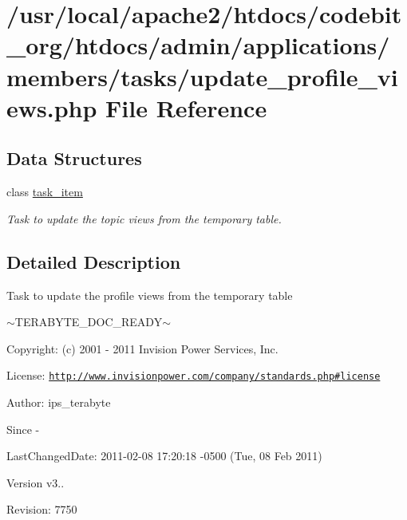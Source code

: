 \hypertarget{update__profile__views_8php}{\section{/usr/local/apache2/htdocs/codebit\-\_\-org/htdocs/admin/applications/members/tasks/update\-\_\-profile\-\_\-views.php File Reference}
\label{update__profile__views_8php}
}
\subsection*{Data Structures}
\begin{DoxyCompactItemize}
\item 
class \hyperlink{classtask__item}{task\-\_\-item}
\begin{DoxyCompactList}\small\item\em Task to update the topic views from the temporary table. \end{DoxyCompactList}\end{DoxyCompactItemize}


\subsection{Detailed Description}
\begin{DoxyVerb}  Task to update the profile views from the temporary table
\end{DoxyVerb}
 $\sim$\-T\-E\-R\-A\-B\-Y\-T\-E\-\_\-\-D\-O\-C\-\_\-\-R\-E\-A\-D\-Y$\sim$ \begin{DoxyParagraph}{Copyright\-:}
(c) 2001 -\/ 2011 Invision Power Services, Inc.
\end{DoxyParagraph}
\begin{DoxyParagraph}{License\-:}
\href{http://www.invisionpower.com/company/standards.php#license}{\tt http\-://www.\-invisionpower.\-com/company/standards.\-php\#license}
\end{DoxyParagraph}
\begin{DoxyParagraph}{Author\-:}
ips\-\_\-terabyte 
\end{DoxyParagraph}
\begin{DoxySince}{Since}
-\/ 
\end{DoxySince}
\begin{DoxyParagraph}{Last\-Changed\-Date\-:}
2011-\/02-\/08 17\-:20\-:18 -\/0500 (Tue, 08 Feb 2011) 
\end{DoxyParagraph}
\begin{DoxyVersion}{Version}
v3.. 
\end{DoxyVersion}
\begin{DoxyParagraph}{Revision\-:}
7750 
\end{DoxyParagraph}
